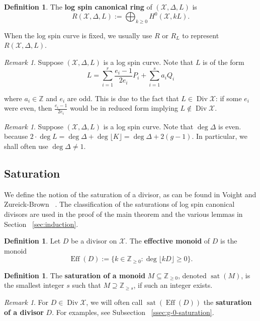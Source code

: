 \documentclass{amsart}
\theoremstyle{plain}
\theoremstyle{definition}
\newtheorem{defn}[thm]{Definition}
\theoremstyle{remark}
\newtheorem{rem}[thm]{Remark}
\numberwithin{equation}{section}
\newcommand\ssec{\subsection}
\newcommand\BZ{{\mathbb Z}}
\DeclareMathOperator\di{Div}
\newcommand\sx{\mathscr X}
\newcommand \subhalf[1]{\frac{{#1} - 1}{2{#1}}}
\newcommand{\halfcan}{L}
\DeclareMathOperator{\Eff}{Eff}
\DeclareMathOperator{\sat}{sat}
\begin{document}
\begin{defn}
\label{defn:log-spin-canonical-ring}
The {\bf log spin canonical ring} of $(\sx, \Delta, \halfcan)$ is
\[
	R(\sx, \Delta, \halfcan) := \bigoplus_{k \geq 0} H^0(\sx, k \halfcan).
\]
\end{defn}

\noindent
When the log spin curve is fixed, we usually use $R$ or $R_\halfcan$ to
represent $R(\sx, \Delta, \halfcan)$.

\begin{rem}
\label{rem:odd-denom}
Suppose $(\sx, \Delta, L)$ is a log spin curve. Note that $\halfcan$ is of the form
\[
	\halfcan = \sum_{i = 1}^{r} \subhalf{e_i} P_i + \sum_{i = 1}^{s} a_i Q_i
\]

\noindent
where $a_i \in \BZ$ and $e_i$ are odd. This is due to the fact
that $\halfcan \in \di \sx$: 
if some $e_i$ were even,
then $\frac{e_i - 1}{2e_i}$ would be in reduced form implying $\halfcan \notin \di \sx$.
\end{rem}
	
\begin{rem}
\label{rem:delta-not-1}
Suppose $(\sx, \Delta, \halfcan)$ is a log spin curve. Note that $\deg \Delta$
is even. because $2 \cdot \deg \halfcan = \deg \Delta + \deg \lfloor K
\rfloor = \deg \Delta + 2(g-1).$
In particular, we shall often use $\deg \Delta \neq 1$.
\end{rem}

\ssec{Saturation}
We define the notion of the saturation of a divisor, as can be
found in Voight and Zureick-Brown ~\cite[Section 7.2]{vzb:stacky}.
The classification of the saturations of log spin canonical
divisors are used in the proof of the main theorem and the various
lemmas in Section ~\ref{sec:induction}.

\begin{defn}
Let $D$ be a divisor on $\sx$. The \textbf{effective monoid} of $D$
is the monoid
\[
	\Eff(D) := \{k \in \BZ_{\geq 0} : \deg \lfloor kD \rfloor \geq 0 \}.
\]
\end{defn}

\begin{defn}
\label{defn:sat}
The \textbf{saturation of a monoid} $M \subseteq \BZ_{\geq 0}$,
denoted $\sat(M)$, is the smallest integer $s$ such that $M
\supseteq \BZ_{\geq s}$, if such an integer exists.
\end{defn}

\begin{rem}
For $D \in \di \sx$, we will often call $\sat(\Eff(D))$ the
\textbf{saturation of a divisor} $D$. For examples,
see Subsection ~\ref{ssec:g-0-saturation}.
\end{rem}
\end{document}
